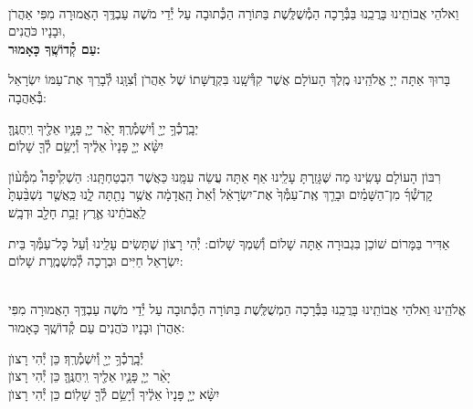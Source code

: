 \documentclass[twoside, openany, parskip=half, 11pt]{book}
\begin{document}
\begin{sometimes}


\\
\shatz {}
וֵאלֹהֵי אֲבוֹתֵֽינוּ בָּרֲכֵֽנוּ בַּבְּ֯רָכָה הַמְ֯שֻׁלֶּֽשֶׁת בַּתּוֹרָה הַכְּ֯תוּבָה עַל יְ֯דֵי מֹשֶׁה עַבְדֶּֽךָ הָאֲמוּרָה מִפִּי אַהֲרֹן וּבָנָיו כֹּהֲנִים,\\
\textbf{עַם קְ֯דוֹשֶֽׁךָ כָּאָמוּר:}

בָּרוּךְ אַתָּה יְיָ אֱלֹהֵֽינוּ מֶֽלֶךְ הָעוֹלָם אֲשֶׁר קִדְּ֯שָֽׁנוּ בִּקְדֻשָּׁתוֹ שֶׁל אַהֲרֹן וְ֯צִוָּֽנוּ לְ֯בָרֵךְ אֶת־עַמּוֹ יִשְׂרָאֵל בְּ֯אַהֲבָה:

יְבָֽרֶכְ֯ךָ֥ יְיָ֖ וְ֯יִשְׁמְ֯רֶֽךָ׃ \quad יָאֵ֨ר יְיָ֧ פָּנָ֛יו אֵלֶ֖יךָ וִֽיחֻנֶּֽךָּ׃\\ יִשָּׂ֨א יְיָ֤ פָּנָיו֙ אֵלֶ֔יךָ וְ֯יָשֵׂ֥ם לְ֯ךָ֖ שָׁלֽוֹם׃

\nextpage

\begin{paracol}{2}
רִבּוֹן הָעוֹלָם עָשִֽׂינוּ מַה שֶּׁגָּזַֽרְתָּ עָלֵֽינוּ אַף אַתָּה עֲשֵׂה עִמָּֽנוּ כַּאֲשֶׁר הִבְטַחְתָּֽנוּ: הַשְׁקִ֩יפָה֩ מִמְּ֯ע֨וֹן קׇדְשְׁ֯ךָ֜ מִן־הַשָּׁמַ֗יִם וּבָרֵ֤ךְ אֶֽת־עַמְּ֯ךָ֙ אֶת־יִשְׂרָאֵ֔ל וְ֯אֵת֙ הָֽאֲדָמָ֔ה אֲשֶׁ֥ר נָתַ֖תָּה לָ֑נוּ כַּֽאֲשֶׁ֤ר נִשְׁבַּ֨עְתָּ֙ לַֽאֲבֹתֵ֔ינוּ אֶ֛רֶץ זָבַ֥ת חָלָ֖ב וּדְבָֽשׁ׃

\switchcolumn

\kahal
אַדִּיר בַּמָּרוֹם שׁוֹכֵן בִּגְבוּרָה אַתָּה שָׁלוֹם וְ֯שִׁמְךָ שָׁלוֹם: יְ֯הִי רָצוֹן שֶׁתָּשִׂים עָלֵֽינוּ וְ֯עַל כׇּל־עַמְּ֯ךָ בֵּית יִשְׂרָאֵל חַיִּים וּבְרָכָה לְ֯מִשְׁמֶֽרֶת שָׁלוֹם:
\end{paracol}

\sepline

\\
אֱלֹהֵֽינוּ וֵאלֹהֵי אֲבוֹתֵֽינוּ בָּרֲכֵֽנוּ בַּבְּ֯רָכָה הַמְשֻׁלֶּֽשֶׁת בַּתּוֹרָה
הַכְּ֯תוּבָה עַל יְ֯דֵי מֹשֶׁה עַבְדֶּֽךָ הָאֲמוּרָה מִפִּי אַהֲרֹן וּבָנָיו כֹּהֲנִים עַם קְ֯דוֹשֶֽׁךָ כָּאָמוּר:

יְ֯בָֽרֶכְ֯ךָ֥ יְיָ֖ וְ֯יִשְׁמְ֯רֶֽךָ׃ \hfill \kahal כֵּן יְ֯הִי רָצוׂן \\
יָאֵ֨ר יְיָ֧ פָּנָ֛יו אֵלֶ֖יךָ וִֽיחֻנֶּֽךָּ׃ \hfill \kahal כֵּן יְ֯הִי רָצוׂן \\
יִשָּׂ֨א יְיָ֤ פָּנָיו֙ אֵלֶ֔יךָ וְ֯יָשֵׂ֥ם לְ֯ךָ֖ שָׁלֽוֹם׃ \hfill \kahal כֵּן יְ֯הִי רָצוׂן

\end{sometimes}
\end{document}
